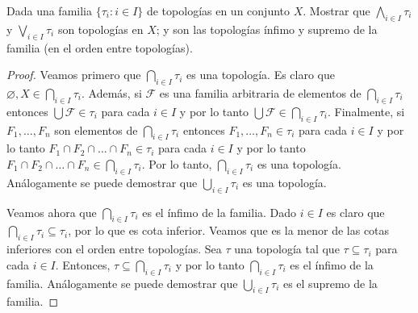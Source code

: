 \documentclass{article}
\theoremstyle{definition}
\newenvironment{ejercicio}[1]{\begin{trivlist}
\item[\hskip \labelsep {\bfseries Ejercicio}\hskip \labelsep {\bfseries #1.}]}{\end{trivlist}}
\begin{document}
\begin{ejercicio}{10}
    Dada una familia \( \{\tau_{i}:i\in I\} \) de topologías en un conjunto \(X\). Mostrar que \(\bigwedge_{i\in I}\tau_{i}\) y \(\bigvee_{i\in I}\tau_{i}\) son topologías en \(X\); y son las topologías ínfimo y supremo de la familia (en el orden entre topologías).
\end{ejercicio}
\begin{proof}
    Veamos primero que \( \bigcap_{i \in I} \tau_i \) es una topología. Es claro que \( \varnothing, X \in \bigcap_{i \in I} \tau_i \). Además, si \( \mathcal{F} \) es una familia arbitraria de elementos de \( \bigcap_{i \in I} \tau_i \) entonces \( \bigcup \mathcal{F} \in \tau_i \) para cada \( i \in I \) y por lo tanto \( \bigcup \mathcal{F} \in \bigcap_{i \in I} \tau_i \). Finalmente, si \( F_1, \ldots, F_n \) son elementos de \( \bigcap_{i \in I} \tau_i \) entonces \( F_1, \ldots, F_n \in \tau_i \) para cada \( i \in I \) y por lo tanto \( F_1 \cap F_2 \cap \ldots \cap F_n \in \tau_i \) para cada \( i \in I\) y por lo tanto \( F_1 \cap F_2 \cap \ldots \cap F_n \in \bigcap_{i \in I} \tau_i \). Por lo tanto, \( \bigcap_{i \in I} \tau_i \) es una topología.
    Análogamente se puede demostrar que \( \bigcup_{i \in I} \tau_i \) es una topología.

    Veamos ahora que \( \bigcap_{i \in I} \tau_i \) es el ínfimo de la familia. Dado \( i \in I \) es claro que \( \bigcap_{i \in I} \tau_i \subseteq \tau_i \), por lo que es cota inferior. Veamos que es la menor de las cotas inferiores con el orden entre topologías. Sea \( \tau \) una topología tal que \( \tau \subseteq \tau_i \) para cada \( i \in I \). Entonces, \( \tau \subseteq \bigcap_{i \in I} \tau_i \) y por lo tanto \( \bigcap_{i \in I} \tau_i \) es el ínfimo de la familia. Análogamente se puede demostrar que \( \bigcup_{i \in I} \tau_i \) es el supremo de la familia.
\end{proof}
\end{document}
